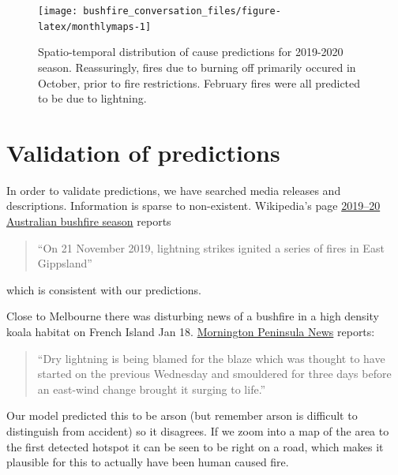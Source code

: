\documentclass[
  11pt,
  a4paper,
]{article}
\begin{document}
\begin{figure}[H]

{\centering \texttt{[image: bushfire\_conversation\_files/figure-latex/monthlymaps-1]} 

}

\caption{Spatio-temporal distribution of cause predictions for 2019-2020 season. Reassuringly, fires due to burning off primarily occured in October, prior to fire restrictions. February fires were all predicted to be due to lightning.}\label{fig:monthlymaps}
\end{figure}

\hypertarget{validation-of-predictions}{%
\section*{Validation of predictions}\label{validation-of-predictions}}

In order to validate predictions, we have searched media releases and descriptions. Information is sparse to non-existent. Wikipedia's page \href{https://en.wikipedia.org/wiki/2019–20_Australian_bushfire_season}{2019--20 Australian bushfire season} reports

\begin{quote}
``On 21 November 2019, lightning strikes ignited a series of fires in East Gippsland''
\end{quote}

which is consistent with our predictions.

Close to Melbourne there was disturbing news of a bushfire in a high density koala habitat on French Island Jan 18. \href{http://www.mpnews.com.au/2020/01/21/all-clear-after-island-fire-fright/}{Mornington Peninsula News} reports:

\begin{quote}
``Dry lightning is being blamed for the blaze which was thought to have started on the previous Wednesday and smouldered for three days before an east-wind change brought it surging to life.''
\end{quote}

Our model predicted this to be arson (but remember arson is difficult to distinguish from accident) so it disagrees. If we zoom into a map of the area to the first detected hotspot it can be seen to be right on a road, which makes it plausible for this to actually have been human caused fire.
\end{document}
